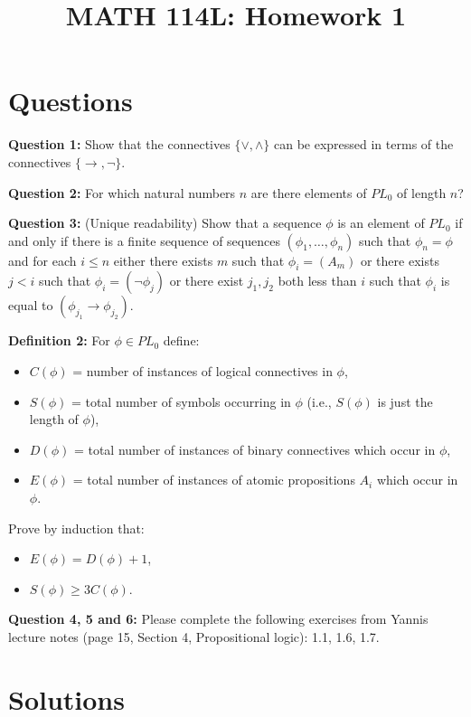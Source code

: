 \documentclass{article}
\title{MATH 114L: Homework 1}
\author{}
\date{}
\begin{document}
\maketitle

\section*{Questions}

\textbf{Question 1:} Show that the connectives \(\{\lor,\land\}\) can be expressed in terms of the connectives \(\{\to,\neg\}\).

\textbf{Question 2:} For which natural numbers \(n\) are there elements of \(PL_0\) of length \(n\)?

\textbf{Question 3:} (Unique readability) Show that a sequence \(\phi\) is an element of \(PL_0\) if and only if there is a finite sequence of sequences \((\phi_1, \ldots, \phi_n)\) such that \(\phi_n = \phi\) and for each \(i \leq n\) either there exists \(m\) such that \(\phi_i = (A_m)\) or there exists \(j < i\) such that \(\phi_i = (\neg \phi_j)\) or there exist \(j_1, j_2\) both less than \(i\) such that \(\phi_i\) is equal to \((\phi_{j_1} \to \phi_{j_2})\).

\textbf{Definition 2:} For \(\phi \in PL_0\) define:
\begin{itemize}
    \item \(C(\phi)\) = number of instances of logical connectives in \(\phi\),
    \item \(S(\phi)\) = total number of symbols occurring in \(\phi\) (i.e., \(S(\phi)\) is just the length of \(\phi\)),
    \item \(D(\phi)\) = total number of instances of binary connectives which occur in \(\phi\),
    \item \(E(\phi)\) = total number of instances of atomic propositions \(A_i\) which occur in \(\phi\).
\end{itemize}
Prove by induction that:
\begin{itemize}
    \item \(E(\phi) = D(\phi) + 1\),
    \item \(S(\phi) \geq 3C(\phi)\).
\end{itemize}

\textbf{Question 4, 5 and 6:} Please complete the following exercises from Yannis lecture notes (page 15, Section 4, Propositional logic): 1.1, 1.6, 1.7.

\section*{Solutions}
\end{document}

